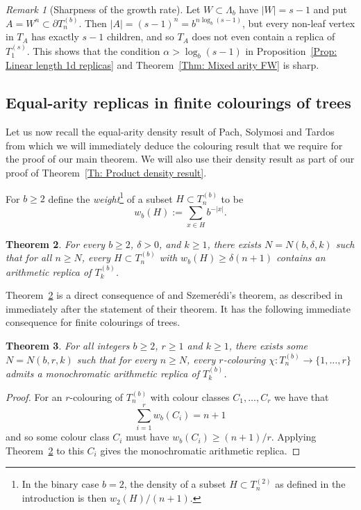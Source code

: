 \documentclass[11pt]{amsart}
\newcommand\labs[1]{\left\lvert#1\right\rvert}
\renewcommand{\geq}{\geqslant}
\theoremstyle{plain}
\newtheorem{thm}{Theorem}[section]
\theoremstyle{definition}
\theoremstyle{remark}
\newtheorem{rema}[thm]{Remark}
\begin{document}
\begin{rema}[Sharpness of the growth rate]
Let $W\subset \Lambda_b$ have $\labs{W} = s-1$ and put $A = W^n \subset \partial T_n^{(b)}$. Then $\labs{A} =(s-1)^n = b^{n\log_b(s-1)}$, but every non-leaf vertex in $T_A$ has exactly $s-1$ children, and so $T_A$ does not even contain a replica of $T_1^{(s)}$. This shows that the condition $\alpha > \log_b(s-1)$ in Proposition~\ref{Prop: Linear length 1d replicas} and Theorem~\ref{Thm: Mixed arity FW} is sharp.
\end{rema}
\subsection{Equal-arity replicas in finite colourings of trees}
Let us now recall the equal-arity density result of Pach, Solymosi and Tardos from which we will immediately deduce the colouring result that we require for the proof of our main theorem. We will also use their density result as part of our proof of Theorem~\ref{Th: Product density result}.

For $b\geq 2$ define the \textit{weight}\footnote{In the binary case $b=2$, the density of a subset $H\subset T_n^{(2)}$ as defined in the introduction is then $w_2(H)/(n+1)$.} of a subset $H\subset T_n^{(b)}$ to be
\[ w_b(H):= \sum_{x\in H} b^{-\labs{x}}.\]
\begin{thm}\label{Thm: Equal arity density}
For every $b\geq 2$, $\delta>0$, and $k\geq 1$, there exists $N=N(b,\delta,k)$ such that for all $n\geq N$, every $H\subset T_n^{(b)}$ with $w_b(H)\geq \delta(n+1)$ contains an arithmetic replica of $T_k^{(b)}$.
\end{thm}
Theorem~\ref{Thm: Equal arity density} is a direct consequence of \cite[Theorem 1']{PST} and Szemer\'{e}di's theorem, as described in \cite{PST} immediately after the statement of their theorem. It has the following immediate consequence for finite colourings of trees.
\begin{thm}\label{Thm: Equal arity colouring}
For all integers $b\geq 2$, $r\geq 1$ and $k\geq 1$, there exists some $N=N(b,r,k)$ such that for every $n\geq N$, every $r$-colouring $\chi :T_n^{(b)} \to \{1,\ldots,r\}$ admits a monochromatic arithmetic replica of $T_k^{(b)}$.
\end{thm}
\begin{proof}
For an $r$-colouring of $T_n^{(b)}$ with colour classes $C_1,\ldots, C_r$ we have that
\[ \sum_{i=1}^r w_b(C_i) = n+1\]
and so some colour class $C_i$ must have $w_b(C_i) \geq (n+1)/r$. Applying Theorem~\ref{Thm: Equal arity density} to this $C_i$ gives the monochromatic arithmetic replica.
\end{proof}
\end{document}
